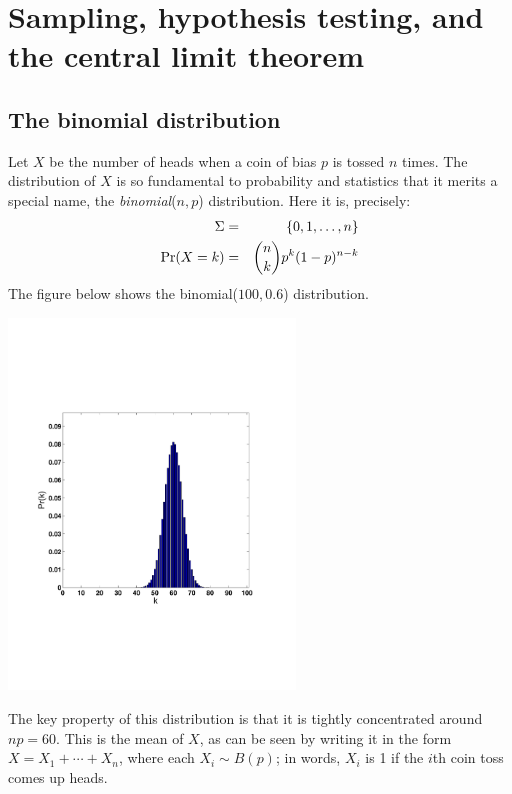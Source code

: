 \chapter{Sampling, hypothesis testing, and the central limit theorem}

\section{The binomial distribution}

Let $X$ be the number of heads when a coin of bias $p$ is tossed $n$ times. 
The distribution of $X$ is so fundamental to probability and statistics that 
it merits a special name, the {\it binomial}($n,p$) distribution. Here it is,
precisely:
\begin{eqnarray*}
\Sigma     & = & \{0,1,\ldots, n\} \\
\mbox{\rm Pr}(X = k) & = & {n \choose k} p^k (1-p)^{n-k}
\end{eqnarray*}
The figure below shows the binomial($100,0.6$) distribution.

\begin{center}
\includegraphics[width=3in]{figs/bin(100,06).pdf}
\end{center}

\noindent
The key property of this distribution is that it is tightly concentrated around
$np = 60$. This is the mean of $X$, as can be seen by writing it in the form
$X = X_1 + \cdots + X_n$, where each $X_i \sim B(p)$; in words, $X_i$ is 1 if
the $i$th coin toss comes up heads.

